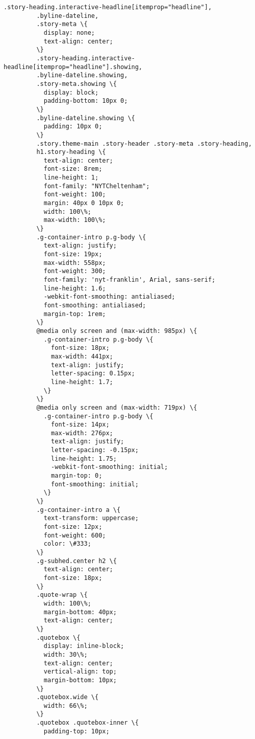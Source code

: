 \documentclass[11pt]{article}
\begin{document}
\begin{Verbatim}[commandchars=\\\{\}]
         .story-heading.interactive-headline[itemprop="headline"],
         .byline-dateline,
         .story-meta \{
           display: none;
           text-align: center;
         \}
         .story-heading.interactive-headline[itemprop="headline"].showing,
         .byline-dateline.showing,
         .story-meta.showing \{
           display: block;
           padding-bottom: 10px 0;
         \}
         .byline-dateline.showing \{
           padding: 10px 0;
         \}
         .story.theme-main .story-header .story-meta .story-heading,
         h1.story-heading \{
           text-align: center;
           font-size: 8rem;
           line-height: 1;
           font-family: "NYTCheltenham";
           font-weight: 100;
           margin: 40px 0 10px 0;
           width: 100\%;
           max-width: 100\%;
         \}
         .g-container-intro p.g-body \{
           text-align: justify;
           font-size: 19px;
           max-width: 558px;
           font-weight: 300;
           font-family: 'nyt-franklin', Arial, sans-serif;
           line-height: 1.6;
           -webkit-font-smoothing: antialiased;
           font-smoothing: antialiased;
           margin-top: 1rem;
         \}
         @media only screen and (max-width: 985px) \{
           .g-container-intro p.g-body \{
             font-size: 18px;
             max-width: 441px;
             text-align: justify;
             letter-spacing: 0.15px;
             line-height: 1.7;
           \}
         \}
         @media only screen and (max-width: 719px) \{
           .g-container-intro p.g-body \{
             font-size: 14px;
             max-width: 276px;
             text-align: justify;
             letter-spacing: -0.15px;
             line-height: 1.75;
             -webkit-font-smoothing: initial;
             margin-top: 0;
             font-smoothing: initial;
           \}
         \}
         .g-container-intro a \{
           text-transform: uppercase;
           font-size: 12px;
           font-weight: 600;
           color: \#333;
         \}
         .g-subhed.center h2 \{
           text-align: center;
           font-size: 18px;
         \}
         .quote-wrap \{
           width: 100\%;
           margin-bottom: 40px;
           text-align: center;
         \}
         .quotebox \{
           display: inline-block;
           width: 30\%;
           text-align: center;
           vertical-align: top;
           margin-bottom: 10px;
         \}
         .quotebox.wide \{
           width: 66\%;
         \}
         .quotebox .quotebox-inner \{
           padding-top: 10px;

\end{Verbatim}
\end{document}
